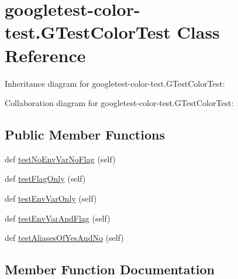 \hypertarget{classgoogletest-color-test_1_1GTestColorTest}{}\section{googletest-\/color-\/test.G\+Test\+Color\+Test Class Reference}
\label{classgoogletest-color-test_1_1GTestColorTest}


Inheritance diagram for googletest-\/color-\/test.G\+Test\+Color\+Test\+:


Collaboration diagram for googletest-\/color-\/test.G\+Test\+Color\+Test\+:
\subsection*{Public Member Functions}
\begin{DoxyCompactItemize}
\item 
def \hyperlink{classgoogletest-color-test_1_1GTestColorTest_ae36014618c6afc19fa6d77babf8faa88}{test\+No\+Env\+Var\+No\+Flag} (self)
\item 
def \hyperlink{classgoogletest-color-test_1_1GTestColorTest_ade41e99b5486c9d947d9b817210174f6}{test\+Flag\+Only} (self)
\item 
def \hyperlink{classgoogletest-color-test_1_1GTestColorTest_a1f0a2bab46c123e865a821307bd689de}{test\+Env\+Var\+Only} (self)
\item 
def \hyperlink{classgoogletest-color-test_1_1GTestColorTest_a8f6cbbaa18feb66b8b03e6cc1f493f49}{test\+Env\+Var\+And\+Flag} (self)
\item 
def \hyperlink{classgoogletest-color-test_1_1GTestColorTest_a82dd36b6a0fa82d417b7ec5e660c6e41}{test\+Aliases\+Of\+Yes\+And\+No} (self)
\end{DoxyCompactItemize}


\subsection{Member Function Documentation}
\mbox{\label{classgoogletest-color-test_1_1GTestColorTest_a82dd36b6a0fa82d417b7ec5e660c6e41}} 
